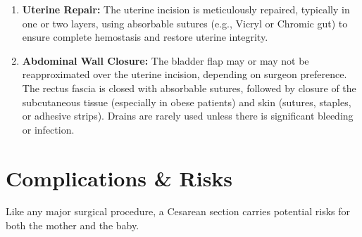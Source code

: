 \begin{enumerate}
  \item \textbf{Uterine Repair:} The uterine incision is meticulously repaired, typically in one or two layers, using absorbable sutures (e.g., Vicryl or Chromic gut) to ensure complete hemostasis and restore uterine integrity.
  \item \textbf{Abdominal Wall Closure:} The bladder flap may or may not be reapproximated over the uterine incision, depending on surgeon preference. The rectus fascia is closed with absorbable sutures, followed by closure of the subcutaneous tissue (especially in obese patients) and skin (sutures, staples, or adhesive strips). Drains are rarely used unless there is significant bleeding or infection.
\end{enumerate}

\section*{Complications \& Risks}
Like any major surgical procedure, a Cesarean section carries potential risks for both the mother and the baby.

